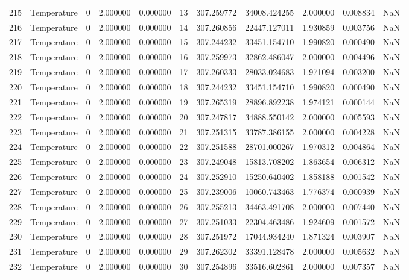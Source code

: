\begin{tabular}{llrrrrrrrrr}
215 & Temperature & 0 & 2.000000 & 0.000000 & 13 & 307.259772 & 34008.424255 & 2.000000 & 0.008834 & NaN \\
216 & Temperature & 0 & 2.000000 & 0.000000 & 14 & 307.260856 & 22447.127011 & 1.930859 & 0.003756 & NaN \\
217 & Temperature & 0 & 2.000000 & 0.000000 & 15 & 307.244232 & 33451.154710 & 1.990820 & 0.000490 & NaN \\
218 & Temperature & 0 & 2.000000 & 0.000000 & 16 & 307.259973 & 32862.486047 & 2.000000 & 0.004496 & NaN \\
219 & Temperature & 0 & 2.000000 & 0.000000 & 17 & 307.260333 & 28033.024683 & 1.971094 & 0.003200 & NaN \\
220 & Temperature & 0 & 2.000000 & 0.000000 & 18 & 307.244232 & 33451.154710 & 1.990820 & 0.000490 & NaN \\
221 & Temperature & 0 & 2.000000 & 0.000000 & 19 & 307.265319 & 28896.892238 & 1.974121 & 0.000144 & NaN \\
222 & Temperature & 0 & 2.000000 & 0.000000 & 20 & 307.247817 & 34888.550142 & 2.000000 & 0.005593 & NaN \\
223 & Temperature & 0 & 2.000000 & 0.000000 & 21 & 307.251315 & 33787.386155 & 2.000000 & 0.004228 & NaN \\
224 & Temperature & 0 & 2.000000 & 0.000000 & 22 & 307.251588 & 28701.000267 & 1.970312 & 0.004864 & NaN \\
225 & Temperature & 0 & 2.000000 & 0.000000 & 23 & 307.249048 & 15813.708202 & 1.863654 & 0.006312 & NaN \\
226 & Temperature & 0 & 2.000000 & 0.000000 & 24 & 307.252910 & 15250.640402 & 1.858188 & 0.001542 & NaN \\
227 & Temperature & 0 & 2.000000 & 0.000000 & 25 & 307.239006 & 10060.743463 & 1.776374 & 0.000939 & NaN \\
228 & Temperature & 0 & 2.000000 & 0.000000 & 26 & 307.255213 & 34463.491708 & 2.000000 & 0.007440 & NaN \\
229 & Temperature & 0 & 2.000000 & 0.000000 & 27 & 307.251033 & 22304.463486 & 1.924609 & 0.001572 & NaN \\
230 & Temperature & 0 & 2.000000 & 0.000000 & 28 & 307.251972 & 17044.934240 & 1.871324 & 0.003907 & NaN \\
231 & Temperature & 0 & 2.000000 & 0.000000 & 29 & 307.262302 & 33391.128478 & 2.000000 & 0.005632 & NaN \\
232 & Temperature & 0 & 2.000000 & 0.000000 & 30 & 307.254896 & 33516.602861 & 2.000000 & 0.007357 & NaN \\

\end{tabular}
